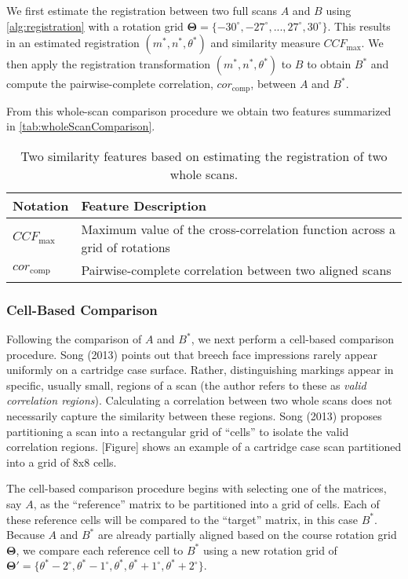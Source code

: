 \documentclass[
]{jdssv}
\begin{document}
We first estimate the registration between two full scans \(A\) and
\(B\) using \autoref{alg:registration} with a rotation grid
\(\pmb{\Theta} = \{-30^\circ, -27^\circ,...,27^\circ,30^\circ\}\). This
results in an estimated registration \((m^*,n^*,\theta^*)\) and
similarity measure \(CCF_{\max}\). We then apply the registration
transformation \((m^*,n^*,\theta^*)\) to \(B\) to obtain \(B^*\) and
compute the pairwise-complete correlation, \(cor_{\text{comp}}\),
between \(A\) and \(B^*\).

From this whole-scan comparison procedure we obtain two features
summarized in \autoref{tab:wholeScanComparison}.

\begin{table}[htbp]
    \centering
    \begin{tabular}{|p{.11\linewidth}|p{.7\linewidth}|}
    \hline
        \textbf{Notation} & \textbf{Feature Description} \\
        \hline
        $CCF_{\max}$ & Maximum value of the cross-correlation function across a grid of rotations \\
        \hline
        $cor_{\text{comp}}$ & Pairwise-complete correlation between two aligned scans \\
        \hline
    \end{tabular}
    \caption{Two similarity features based on estimating the registration of two whole scans.}
    \label{tab:wholeScanComparison}
\end{table}

\hypertarget{cell-based-comparison}{%
\subsubsection{Cell-Based Comparison}\label{cell-based-comparison}}

Following the comparison of \(A\) and \(B^*\), we next perform a
cell-based comparison procedure. Song (2013) points out that breech face
impressions rarely appear uniformly on a cartridge case surface. Rather,
distinguishing markings appear in specific, usually small, regions of a
scan (the author refers to these as \emph{valid correlation regions}).
Calculating a correlation between two whole scans does not necessarily
capture the similarity between these regions. Song (2013) proposes
partitioning a scan into a rectangular grid of ``cells'' to isolate the
valid correlation regions. {[}Figure{]} shows an example of a cartridge
case scan partitioned into a grid of 8x8 cells.

The cell-based comparison procedure begins with selecting one of the
matrices, say \(A\), as the ``reference'' matrix to be partitioned into
a grid of cells. Each of these reference cells will be compared to the
``target'' matrix, in this case \(B^*\). Because \(A\) and \(B^*\) are
already partially aligned based on the course rotation grid
\(\pmb{\Theta}\), we compare each reference cell to \(B^*\) using a new
rotation grid of
\(\pmb{\Theta}' = \{\theta^* - 2^\circ, \theta^* - 1^\circ,\theta^*,\theta^* + 1^\circ,\theta^* + 2^\circ\}\).
\end{document}

